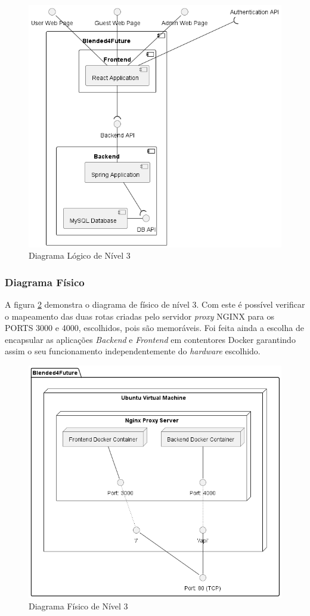 \begin{figure}[h!tbp]
    \centering
    \includegraphics[width=0.8\linewidth]{capitulos/cap3-analisedoproblema/assets/arquiteturasistema/logical/logical_l3.png}
    \caption{Diagrama Lógico de Nível 3}
    \label{fig:diagram-lvl3-logical}
\end{figure}

\subsubsection{Diagrama Físico} 
A figura \ref{fig:diagram-lvl3-physical} demonstra o diagrama de físico de nível 3. Com este é possível verificar o mapeamento das duas rotas criadas pelo servidor \textit{proxy} \gls{NGINX} para os PORTS 3000 e 4000, escolhidos, pois são memoráveis. Foi feita ainda a escolha de encapsular as aplicações \textit{Backend} e \textit{Frontend} em contentores \gls{Docker} garantindo assim o seu funcionamento independentemente do \textit{hardware} escolhido.

\begin{figure}[h!tbp]
    \centering
    \includegraphics[width=0.7\linewidth]{capitulos/cap3-analisedoproblema/assets/arquiteturasistema/physical/physical_l3.png}
    \caption{Diagrama Físico de Nível 3}
    \label{fig:diagram-lvl3-physical}
\end{figure}





